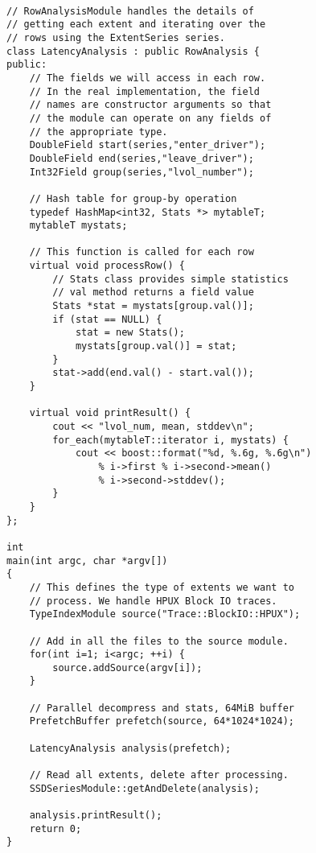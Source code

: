 { \footnotesize
\begin{verbatim}

// RowAnalysisModule handles the details of 
// getting each extent and iterating over the 
// rows using the ExtentSeries series.
class LatencyAnalysis : public RowAnalysis {
public:
    // The fields we will access in each row. 
    // In the real implementation, the field 
    // names are constructor arguments so that 
    // the module can operate on any fields of
    // the appropriate type.
    DoubleField start(series,"enter_driver");
    DoubleField end(series,"leave_driver");
    Int32Field group(series,"lvol_number");

    // Hash table for group-by operation
    typedef HashMap<int32, Stats *> mytableT;
    mytableT mystats;

    // This function is called for each row
    virtual void processRow() {
        // Stats class provides simple statistics
        // val method returns a field value
        Stats *stat = mystats[group.val()];
        if (stat == NULL) {
            stat = new Stats();
            mystats[group.val()] = stat;
        }
        stat->add(end.val() - start.val());
    }

    virtual void printResult() {
        cout << "lvol_num, mean, stddev\n";
        for_each(mytableT::iterator i, mystats) {
            cout << boost::format("%d, %.6g, %.6g\n") 
                % i->first % i->second->mean() 
                % i->second->stddev();
        }
    }
};

int
main(int argc, char *argv[]) 
{
    // This defines the type of extents we want to 
    // process. We handle HPUX Block IO traces.
    TypeIndexModule source("Trace::BlockIO::HPUX");

    // Add in all the files to the source module.
    for(int i=1; i<argc; ++i) {
        source.addSource(argv[i]);
    }

    // Parallel decompress and stats, 64MiB buffer
    PrefetchBuffer prefetch(source, 64*1024*1024);

    LatencyAnalysis analysis(prefetch);

    // Read all extents, delete after processing.
    SSDSeriesModule::getAndDelete(analysis);
    
    analysis.printResult();
    return 0;
}

\end{verbatim}
}

